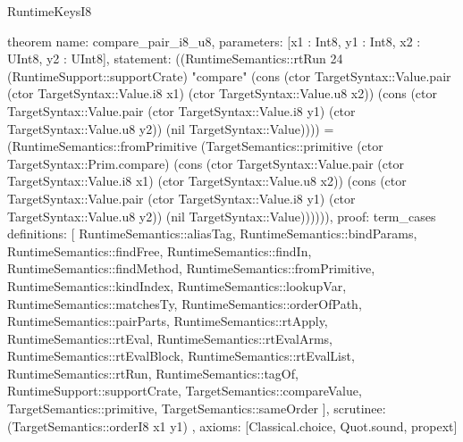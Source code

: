 \begin{lexlean}{RuntimeKeysI8}
\begin{semanticmodule}
theorem{
  name: compare_pair_i8_u8,
  parameters: [x1 : Int8, y1 : Int8, x2 : UInt8, y2 : UInt8],
  statement: ((RuntimeSemantics::rtRun 24 (RuntimeSupport::supportCrate) "compare" (cons (ctor TargetSyntax::Value.pair (ctor TargetSyntax::Value.i8 x1) (ctor TargetSyntax::Value.u8 x2)) (cons (ctor TargetSyntax::Value.pair (ctor TargetSyntax::Value.i8 y1) (ctor TargetSyntax::Value.u8 y2)) (nil TargetSyntax::Value)))) = (RuntimeSemantics::fromPrimitive (TargetSemantics::primitive (ctor TargetSyntax::Prim.compare) (cons (ctor TargetSyntax::Value.pair (ctor TargetSyntax::Value.i8 x1) (ctor TargetSyntax::Value.u8 x2)) (cons (ctor TargetSyntax::Value.pair (ctor TargetSyntax::Value.i8 y1) (ctor TargetSyntax::Value.u8 y2)) (nil TargetSyntax::Value)))))),
  proof: term_cases{
    definitions: [
      RuntimeSemantics::aliasTag,
      RuntimeSemantics::bindParams,
      RuntimeSemantics::findFree,
      RuntimeSemantics::findIn,
      RuntimeSemantics::findMethod,
      RuntimeSemantics::fromPrimitive,
      RuntimeSemantics::kindIndex,
      RuntimeSemantics::lookupVar,
      RuntimeSemantics::matchesTy,
      RuntimeSemantics::orderOfPath,
      RuntimeSemantics::pairParts,
      RuntimeSemantics::rtApply,
      RuntimeSemantics::rtEval,
      RuntimeSemantics::rtEvalArms,
      RuntimeSemantics::rtEvalBlock,
      RuntimeSemantics::rtEvalList,
      RuntimeSemantics::rtRun,
      RuntimeSemantics::tagOf,
      RuntimeSupport::supportCrate,
      TargetSemantics::compareValue,
      TargetSemantics::primitive,
      TargetSemantics::sameOrder
    ],
    scrutinee: (TargetSemantics::orderI8 x1 y1)
  },
  axioms: [Classical.choice, Quot.sound, propext]
}


\end{semanticmodule}
\end{lexlean}
